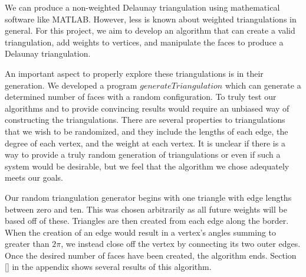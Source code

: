 \documentclass[12pt]{article}
\begin{document}
\noindent We can produce a non-weighted Delaunay triangulation using mathematical software like MATLAB. However, less is known about weighted triangulations in general. For this project, we aim to develop an algorithm that can create a valid triangulation, add weights to vertices, and manipulate the faces to produce a Delaunay triangulation.\newline

\noindent An important aspect to properly explore these triangulations is in their generation. We developed a program $generateTriangulation$ which can generate a determined number of faces with a random configuration. To truly test our algorithms and to provide convincing results would require an unbiased way of constructing the triangulations. There are several properties to triangulations that we wish to be randomized, and they include the lengths of each edge, the degree of each vertex, and the weight at each vertex. It is unclear if there is a way to provide a truly random generation of triangulations or even if such a system would be desirable, but we feel that the algorithm we chose adequately meets our goals.\newline

\noindent Our random triangulation generator begins with one triangle with edge lengths between zero and ten. This was chosen arbitrarily as all future weights will be based off of these. Triangles are then created from each edge along the border. When the creation of an edge would result in a vertex's angles summing to greater than $2\pi$, we instead close off the vertex by connecting its two outer edges. Once the desired number of faces have been created, the algorithm ends. Section [] in the appendix shows several results of this algorithm.\newline
\end{document}
